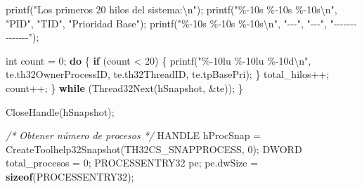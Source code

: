 \documentclass[
  spanish,
]{article}
\newenvironment{Shaded}{}{}
\newcommand{\CommentTok}[1]{\textcolor[rgb]{0.38,0.63,0.69}{\textit{#1}}}
\newcommand{\ControlFlowTok}[1]{\textcolor[rgb]{0.00,0.44,0.13}{\textbf{#1}}}
\newcommand{\DataTypeTok}[1]{\textcolor[rgb]{0.56,0.13,0.00}{#1}}
\newcommand{\DecValTok}[1]{\textcolor[rgb]{0.25,0.63,0.44}{#1}}
\newcommand{\KeywordTok}[1]{\textcolor[rgb]{0.00,0.44,0.13}{\textbf{#1}}}
\newcommand{\NormalTok}[1]{#1}
\newcommand{\OperatorTok}[1]{\textcolor[rgb]{0.40,0.40,0.40}{#1}}
\newcommand{\SpecialCharTok}[1]{\textcolor[rgb]{0.25,0.44,0.63}{#1}}
\newcommand{\StringTok}[1]{\textcolor[rgb]{0.25,0.44,0.63}{#1}}
\begin{document}
\begin{Shaded}
\begin{Highlighting}[]
\NormalTok{        printf}\OperatorTok{(}\StringTok{"Los primeros 20 hilos del sistema:}\SpecialCharTok{\textbackslash{}n}\StringTok{"}\OperatorTok{);}
\NormalTok{        printf}\OperatorTok{(}\StringTok{"}\SpecialCharTok{\%{-}10s}\StringTok{ }\SpecialCharTok{\%{-}10s}\StringTok{ }\SpecialCharTok{\%{-}10s\textbackslash{}n}\StringTok{"}\OperatorTok{,} \StringTok{"PID"}\OperatorTok{,} \StringTok{"TID"}\OperatorTok{,} \StringTok{"Prioridad Base"}\OperatorTok{);}
\NormalTok{        printf}\OperatorTok{(}\StringTok{"}\SpecialCharTok{\%{-}10s}\StringTok{ }\SpecialCharTok{\%{-}10s}\StringTok{ }\SpecialCharTok{\%{-}10s\textbackslash{}n}\StringTok{"}\OperatorTok{,} \StringTok{"{-}{-}{-}"}\OperatorTok{,} \StringTok{"{-}{-}{-}"}\OperatorTok{,} \StringTok{"{-}{-}{-}{-}{-}{-}{-}{-}{-}{-}{-}{-}{-}{-}"}\OperatorTok{);}

        \DataTypeTok{int}\NormalTok{ count }\OperatorTok{=} \DecValTok{0}\OperatorTok{;}
        \ControlFlowTok{do} \OperatorTok{\{}
            \ControlFlowTok{if} \OperatorTok{(}\NormalTok{count }\OperatorTok{\textless{}} \DecValTok{20}\OperatorTok{)} \OperatorTok{\{}
\NormalTok{                printf}\OperatorTok{(}\StringTok{"}\SpecialCharTok{\%{-}10lu}\StringTok{ }\SpecialCharTok{\%{-}10lu}\StringTok{ }\SpecialCharTok{\%{-}10d\textbackslash{}n}\StringTok{"}\OperatorTok{,}
\NormalTok{                       te}\OperatorTok{.}\NormalTok{th32OwnerProcessID}\OperatorTok{,}
\NormalTok{                       te}\OperatorTok{.}\NormalTok{th32ThreadID}\OperatorTok{,}
\NormalTok{                       te}\OperatorTok{.}\NormalTok{tpBasePri}\OperatorTok{);}
            \OperatorTok{\}}
\NormalTok{            total\_hilos}\OperatorTok{++;}
\NormalTok{            count}\OperatorTok{++;}
        \OperatorTok{\}} \ControlFlowTok{while} \OperatorTok{(}\NormalTok{Thread32Next}\OperatorTok{(}\NormalTok{hSnapshot}\OperatorTok{,} \OperatorTok{\&}\NormalTok{te}\OperatorTok{));}
    \OperatorTok{\}}

\NormalTok{    CloseHandle}\OperatorTok{(}\NormalTok{hSnapshot}\OperatorTok{);}

    \CommentTok{/* Obtener número de procesos */}
\NormalTok{    HANDLE hProcSnap }\OperatorTok{=}\NormalTok{ CreateToolhelp32Snapshot}\OperatorTok{(}\NormalTok{TH32CS\_SNAPPROCESS}\OperatorTok{,} \DecValTok{0}\OperatorTok{);}
\NormalTok{    DWORD total\_procesos }\OperatorTok{=} \DecValTok{0}\OperatorTok{;}
\NormalTok{    PROCESSENTRY32 pe}\OperatorTok{;}
\NormalTok{    pe}\OperatorTok{.}\NormalTok{dwSize }\OperatorTok{=} \KeywordTok{sizeof}\OperatorTok{(}\NormalTok{PROCESSENTRY32}\OperatorTok{);}


\end{Highlighting}
\end{Shaded}
\end{document}

